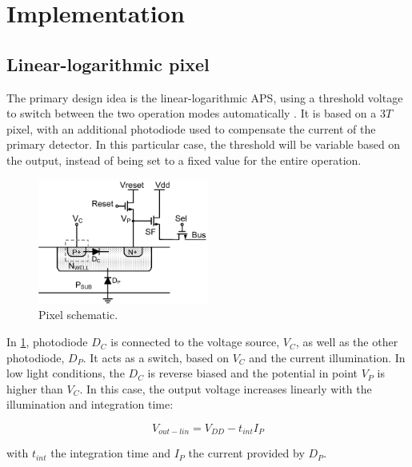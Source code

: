 \section{Implementation}

\subsection{Linear-logarithmic pixel}

The primary design idea is the linear-logarithmic APS, using a threshold voltage to switch between the 
two operation modes automatically \cite{withTable, withCompensation}. It is based on a \(3T\) pixel,
with an additional photodiode used to compensate the current of the primary detector. In this particular case,
the threshold will be variable based on the output, instead of being set to a fixed value for the entire operation.

\begin{figure}[H]
    \includegraphics[width=0.50\textwidth, height=0.45\textwidth]{resources/png/secondCircuit.png}
    \caption{Pixel schematic. \cite{withCompensation} \label{figPixel}}
\end{figure}

In \ref{figPixel}, photodiode \(D_{C}\) is connected to the voltage source, \(V_{C}\), as well as the other
photodiode, \(D_{P}\). It acts as a switch, based on \(V_{C}\) and the current illumination. In low light conditions,
the \(D_{C}\) is reverse biased and the potential in point \(V_{P}\) is higher than \(V_{C}\). In this case,
the output voltage increases linearly with the illumination and integration time:

\begin{equation}
    \label{eqLinOutput}
    V_{out-lin} = V_{DD} - {t_{int}I_{P}}
\end{equation}

with \(t_{int}\) the integration time and \(I_{P}\) the current provided by \(D_{P}\).

